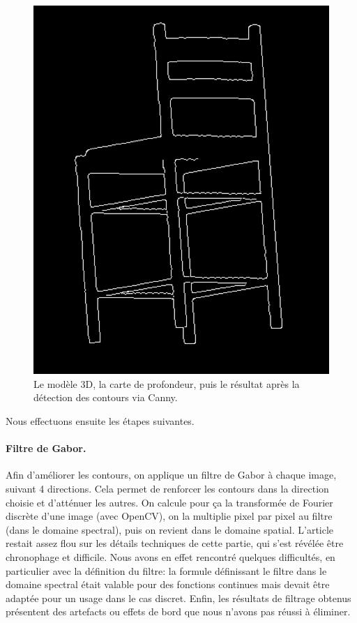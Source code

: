 \documentclass[12pt, a4paper, oneside]{article}
\begin{document}
\begin{figure}
\begin{center}
        \includegraphics[scale=0.41]{images/chaise-cany.png}
        \caption{Le modèle 3D, la carte de profondeur, puis le résultat après la détection des contours via Canny.\label{img:generer-vues}}
    \end{center}
\end{figure}

Nous effectuons ensuite les étapes suivantes.
\paragraph{Filtre de Gabor.}
Afin d'améliorer les contours, on applique un filtre de Gabor à chaque image, suivant 4 directions.
Cela permet de renforcer les contours dans la direction choisie et d'atténuer les autres.
On calcule pour ça la transformée de Fourier discrète d'une image (avec OpenCV), on la multiplie pixel par pixel au filtre (dans le domaine spectral), puis on revient dans le domaine spatial.
L'article restait assez flou sur les détails techniques de cette partie, qui s'est révélée être chronophage et difficile.
Nous avons en effet rencontré quelques difficultés, en particulier avec la définition du filtre: la formule définissant le filtre dans le domaine spectral était valable pour des fonctions continues mais devait être adaptée pour un usage dans le cas discret.
Enfin, les résultats de filtrage obtenus présentent des artefacts ou effets de bord que nous n'avons pas réussi à éliminer.
\end{document}
